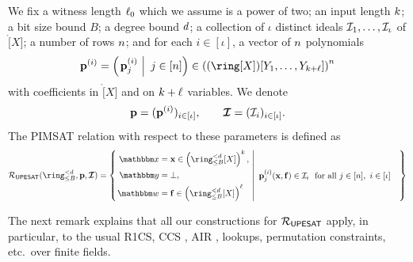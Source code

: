 \documentclass[11pt,letterpaper,usenames,dvipsnames]{article}
\begin{document}
We fix a witness length $\ell_0$ which we assume is a power of two; an input length $k$; a bit size bound $B$; a degree bound $d$; a collection of $\iota$ distinct ideals $\mathcal{I}_1, \ldots, \mathcal{I}_{\iota}$ of $\ring[X]$; a number of rows $n$; and for each $i\in [\iota]$, a vector of $n$ polynomials
$$\mathbf{p}^{(i)} = \left(\left.\mathbf{p}_{j}^{(i)} \ \right| \ j\in[\numrows]\right) \in \left((\ring[X])[Y_1,\ldots, Y_{\inplen+\codedim}]\right)^{\numrows}$$ with coefficients in $\ring[X]$ and on $k + \ell$ variables. We denote $$\mathbf{p} = (\mathbf{p}^{(i)})_{i\in [\iota]}, \qquad \bm{\mathcal{I}}=(\mathcal{I}_i)_{i\in[\iota]}.$$ 
%
The PIMSAT relation with respect to these parameters is defined as
$$
\PIMSAT(\ringtwobounds{B}{\moduledegree}, \pp,\bm{\ideal}) 
= \left\{\left. 
\begin{aligned}
    \inp &= \xx \in \left(\ringtwobounds{B}{\moduledegree}[X]\right)^{\inplen},\\
    \oracle &=\bot,\\
    \wit &=\bff \in \left(\ringtwobounds{B}{\moduledegree}[X]\right)^\codedim
\end{aligned} 
\ \right| \ 
\begin{aligned}
    &\mathbf{p}_{j}^{(i)}(\xx, \bff) \in \ideal_i \ \text{ for all } j\in [\numrows], \ i \in [\iota]
\end{aligned}
\right\}
$$

The next remark explains that all our constructions for $\mathcal{R}_{\mathsf{UPESAT}}$ apply, in particular, to the usual R1CS, CCS \cite{ccs}, AIR \cite{air}, lookups,  permutation constraints, etc.\ over finite fields.


\end{document}
